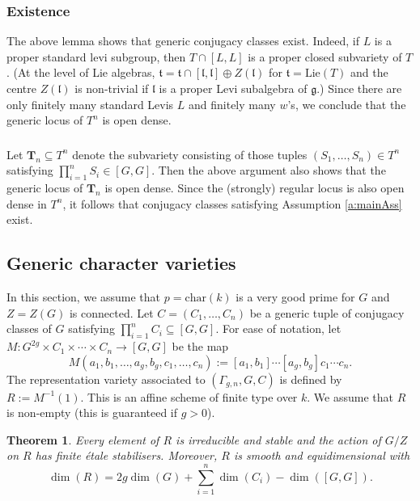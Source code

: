\documentclass[12pt]{amsart}
\theoremstyle{plain}
\newtheorem{thm}{Theorem}
\theoremstyle{definition}
\theoremstyle{remark}
\newcommand{\ra}{\rightarrow}
\newcommand{\bR}{R}
\newcommand{\fg}{\mathfrak{g}}
\newcommand{\ft}{\mathfrak{t}}
\newcommand{\fl}{\mathfrak{l}}
\begin{document}
 

\subsubsection{Existence} The above lemma shows that generic conjugacy classes exist. Indeed, if $L$ is a proper standard levi subgroup, then $T\cap [L,L]$ is a proper closed subvariety of $T$. (At the level of Lie algebras, $\ft=\ft\cap [\fl,\fl]\oplus Z(\fl)$ for $\ft=\mathrm{Lie}(T)$ and the centre $Z(\fl)$ is non-trivial if $\fl$ is a proper Levi subalgebra of $\fg$.) Since there are only finitely many standard Levis $L$ and finitely many $w$'s, we conclude that the generic locus of $T^n$ is open dense.


\subsubsection{} \label{s:existence} Let  $\mathbf{T}_n \subseteq T^n$ denote the subvariety consisting of those tuples $(S_1,\ldots,S_n)\in T^n$ satisfying $\prod_{i=1}^n S_i \in [G,G]$. Then the above argument also shows that the generic locus of $\mathbf{T}_n$ is open dense. Since the (strongly) regular locus is also open dense in $T^n$, it follows that conjugacy classes satisfying Assumption \ref{a:mainAss} exist. 

 

\subsection{Generic character varieties} \label{s:genericVar} In this section, we assume that $p=\mathrm{char}(k)$ is a very good prime for $G$ and $Z=Z(G)$ is connected.  
Let $C=(C_1,\ldots, C_n)$ be a generic tuple of conjugacy classes of $G$ satisfying $\prod_{i=1}^n C_i \subseteq [G,G]$. For ease of notation, let $M\colon G^{2g}\times C_1\times \cdots \times C_n \ra [G,G]$ be the map
\[
M(a_1,b_1,\ldots, a_g, b_g, c_1,\ldots, c_n) := [a_1,b_1]\cdots [a_g, b_g]c_1\cdots c_n.
  \]
The representation variety associated to $(\Gamma_{g,n}, G, C)$  is defined by $\bR:=M^{-1}(1)$. This is an affine scheme of finite type over $k$.  We assume that $R$ is non-empty (this is guaranteed if $g>0$). 


\begin{thm} Every element of $\bR$ is irreducible and stable and the action of $G/Z$ on $R$ has finite \'etale stabilisers. Moreover, 
 $\bR$ is smooth and equidimensional with
\[
\dim(\bR) = 2g\dim(G)+\sum_{i=1}^n \dim(C_i) - \dim([G,G]). 
\]
\end{thm} 
\end{document}

